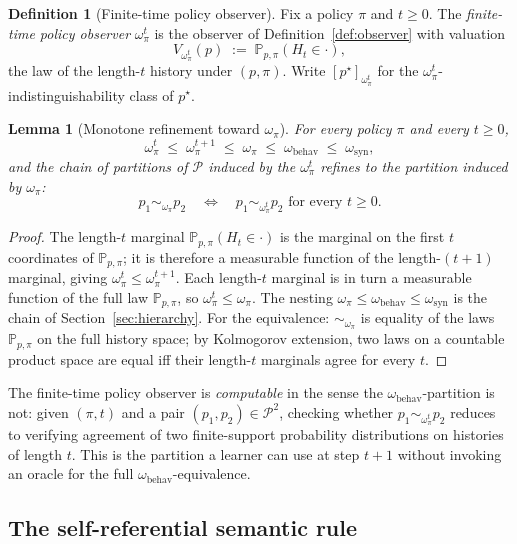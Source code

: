 \documentclass[11pt]{article}
\newtheorem{lemma}[theorem]{Lemma}
\theoremstyle{definition}
\newtheorem{definition}[theorem]{Definition}
\theoremstyle{remark}
\newcommand{\Pcal}{\mathcal{P}}
\newcommand{\Prob}{\mathbb{P}}
\begin{document}
\begin{definition}[Finite-time policy observer]
\label{def:finite-time-policy-observer}
Fix a policy $\pi$ and $t\ge 0$. The \emph{finite-time policy observer} $\omega_\pi^t$ is the observer of Definition~\ref{def:observer} with valuation
\[
V_{\omega_\pi^t}(p)\;:=\;\Prob_{p,\pi}(H_t\in\cdot),
\]
the law of the length-$t$ history under $(p,\pi)$. Write $[p^\star]_{\omega_\pi^t}$ for the $\omega_\pi^t$-indistinguishability class of $p^\star$.
\end{definition}

\begin{lemma}[Monotone refinement toward $\omega_\pi$]
\label{lem:monotone-refinement}
For every policy $\pi$ and every $t\ge 0$,
\[
\omega_\pi^t\;\le\;\omega_\pi^{t+1}\;\le\;\omega_\pi\;\le\;\omega_{\mathrm{behav}}\;\le\;\omega_{\mathrm{syn}},
\]
and the chain of partitions of $\Pcal$ induced by the $\omega_\pi^t$ refines to the partition induced by $\omega_\pi$:
\[
p_1\sim_{\omega_\pi}p_2\quad\Longleftrightarrow\quad p_1\sim_{\omega_\pi^t}p_2\text{ for every }t\ge 0.
\]
\end{lemma}

\begin{proof}
The length-$t$ marginal $\Prob_{p,\pi}(H_t\in\cdot)$ is the marginal on the first $t$ coordinates of $\Prob_{p,\pi}$; it is therefore a measurable function of the length-$(t+1)$ marginal, giving $\omega_\pi^t\le\omega_\pi^{t+1}$. Each length-$t$ marginal is in turn a measurable function of the full law $\Prob_{p,\pi}$, so $\omega_\pi^t\le\omega_\pi$. The nesting $\omega_\pi\le\omega_{\mathrm{behav}}\le\omega_{\mathrm{syn}}$ is the chain of Section~\ref{sec:hierarchy}. For the equivalence: $\sim_{\omega_\pi}$ is equality of the laws $\Prob_{p,\pi}$ on the full history space; by Kolmogorov extension, two laws on a countable product space are equal iff their length-$t$ marginals agree for every $t$.
\end{proof}

The finite-time policy observer is \emph{computable} in the sense the $\omega_{\mathrm{behav}}$-partition is not: given $(\pi,t)$ and a pair $(p_1,p_2)\in\Pcal^2$, checking whether $p_1\sim_{\omega_\pi^t}p_2$ reduces to verifying agreement of two finite-support probability distributions on histories of length $t$. This is the partition a learner can use at step $t+1$ without invoking an oracle for the full $\omega_{\mathrm{behav}}$-equivalence.

\subsection{The self-referential semantic rule}
\label{sec:self-ref-rule}
\end{document}

